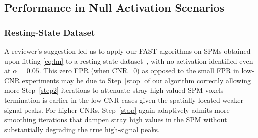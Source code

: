 \begin{comment}
\subsection{Experimental Set-up: Phantom Signal}
These phantom datasets are from the experimental section of ~\citep{polzheletal10} and the example of the {\tt fmri} package. The art-stripe dataset consist in a numerical simulation of an artificial dataset. This phantom simulated a situation where the fMRI response depends on two stimuli, left/right (L/R), and analyze their contrast. The phantom consists of 10 slices with only the fifth slice containing activation. The designed stripes with different widths (1-4)at an in-plane matrix of $64\times 64$. This are divide in $16 \times 16$, $32 \times 32$ and $64 \times 64$. We thanks the authors for providing their code, we used the same experimental set-up their used in their work. Same as the modified Hoff experiment, we compared our methodology as well the competing algorithms for this Phantom Signal and art-strip data sets. 
\end{comment}
\subsection{Performance in Null Activation Scenarios}
\subsubsection{Resting-State Dataset}
\label{resting}
A reviewer's suggestion led us to apply our FAST algorithms on SPMs
obtained upon 
fitting \eqref{eq:lm} to a  resting state 
dataset~\citet{barberetal2011,nebeletal2014}, with no  activation
identified even at $\alpha=0.05$. This zero FPR (when CNR=0) as
opposed to the small FPR in low-CNR experiments may be due
to  Step~\ref{stop} of our algorithm correctly allowing more
Step~\ref{step2} iterations to
attenuate stray high-valued SPM voxels -- termination is earlier
in the low CNR cases %
given the spatially located weaker-signal peaks. For higher CNRs,
Step~\ref{stop} again adaptively admits more smoothing iterations
that  dampen stray high values in the SPM without substantially
degrading the true high-signal peaks. %

